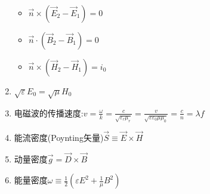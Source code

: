 \documentclass{article}
\begin{document}
\begin{enumerate}[label=(\arabic*)]
\begin{itemize}
          \item $\vec{n}\times (\vec{E}_2-\vec{E}_1)=0$
          \item $\vec{n}\cdot (\vec{B}_2-\vec{B}_1)=0$
          \item $\vec{n}\times (\vec{H}_2-\vec{H}_1)=i_0$
        \end{itemize}
  \item $\sqrt{\varepsilon}E_0=\sqrt{\mu}H_0$
  \item 电磁波的传播速度:$v=\frac{\omega}{k}=\frac{c}{\sqrt{\varepsilon_r \mu_r}}=\frac{v}{\sqrt{\varepsilon \varepsilon_0 \mu \mu_0}}=\frac{c}{n}=\lambda f$
  \item 能流密度(Poynting矢量)$\vec{S}\equiv \vec{E}\times \vec{H}$
  \item 动量密度$\vec{g}=\vec{D}\times \vec{B}$
  \item 能量密度$\omega \equiv \frac{1}{2}\left(\varepsilon E^2+\frac{1}{\mu}B^2\right)$
\end{enumerate}
\end{document}
